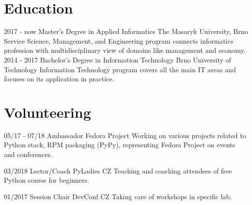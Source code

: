 \documentclass[]{friggeri-cv}
\begin{document}
\section{Education}
\begin{entrylist}
  \entry
    {2017 - now}
    {Master's Degree in Applied Informatics}
    {The Masaryk University, Brno}
    {Service Science, Management, and Engineering program connects informatics profession with
    multidisciplinary view of domains like management and economy.\\}
  \entry
    {2014 - 2017}
    {Bachelor's Degree in Information Technology}
    {Brno University of Technology}
    {Information Technology program covers all the main IT areas and focuses on its application in practice.\\}
\end{entrylist}

\section{Volunteering}
\begin{entrylist}
    \entry
    {05/17 - 07/18}
    {Ambassador}
    {Fedora Project}
    {Working on various projects related to Python stack, RPM packaging (PyPy), representing Fedora
    Project on events and conferences.\\}

  \entry
    {03/2018}
    {Lector/Coach}
    {PyLadies CZ}
    {Teaching and coaching attendees of free Python course for beginners.\\}

  \entry
    {01/2017}
    {Session Chair}
    {DevConf CZ}
    {Taking care of workshops in specific lab.\\}
\end{entrylist}

\end{document}
